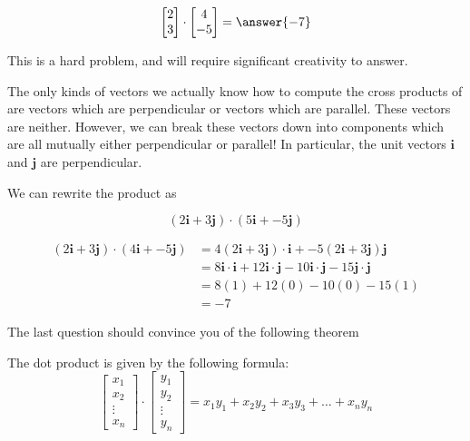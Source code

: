 \documentclass{ximera}
\begin{document}
\begin{question}
\[
\begin{bmatrix} 2 \\ 3 \end{bmatrix} \cdot \begin{bmatrix}4 \\ -5\end{bmatrix} = \answer{-7} 
\]

This is a hard problem, and will require significant creativity to answer.

\begin{hint}
	The only kinds of vectors we actually know how to compute the cross products of are vectors which are perpendicular or vectors which are parallel.  These vectors are neither.  However, we can break these vectors down into components which are all mutually either perpendicular or parallel!  In particular, the unit vectors $\mathbf{i}$ and $\mathbf{j}$ are perpendicular. 
\end{hint}

\begin{hint}
	We can rewrite the product as
	
	\[
	(2\mathbf{i}+3\mathbf{j}) \cdot (5\mathbf{i} +-5\mathbf{j})
	\]
\end{hint}

\begin{hint}
	\begin{align*}
		(2\mathbf{i}+3\mathbf{j}) \cdot (4\mathbf{i} +-5\mathbf{j}) &= 4(2\mathbf{i}+3\mathbf{j}) \cdot \mathbf{i}+ -5(2\mathbf{i}+3\mathbf{j}) \mathbf{j}\\
			&=8\mathbf{i} \cdot \mathbf{i} +12 \mathbf{i} \cdot \mathbf{j}-10\mathbf{i} \cdot \mathbf{j}-15\mathbf{j} \cdot \mathbf{j}\\
			&=8(1)+12(0)-10(0)-15(1)\\
			&=-7
	\end{align*}
\end{hint}
\end{question}

The last question should convince you of the following theorem

\begin{theorem}
	The dot product is given by the following formula:
	\[
	\begin{bmatrix}x_1\\x_2\\\vdots\\x_n\end{bmatrix} \cdot  \begin{bmatrix}y_1\\y_2\\\vdots\\y_n\end{bmatrix} =x_1y_1+x_2y_2+x_3y_3+\dots + x_ny_n
	\]
\end{theorem}
\end{document}
